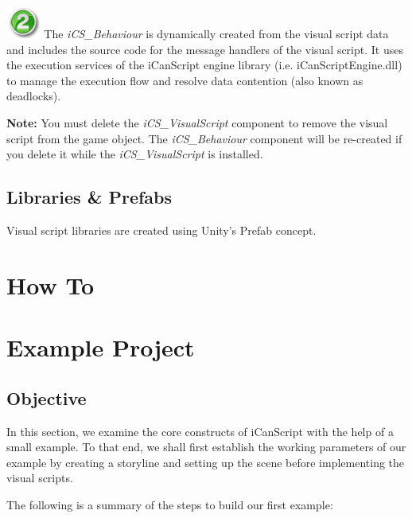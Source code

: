 \includegraphics[width=32pt,height=30pt]{stamp-2-green.png} The \emph{iCS\_Behaviour} is dynamically created from the visual script data and includes the source code for the message handlers of the visual script. It uses the execution services of the iCanScript engine library (i.e. iCanScriptEngine.dll) to manage the execution flow and resolve data contention (also known as deadlocks).
\begin{tipbox}

\textbf{Note:} You must delete the \emph{iCS\_VisualScript} component to remove the visual script from the game object. The \emph{iCS\_Behaviour} component will be re-created if you delete it while the \emph{iCS\_VisualScript} is installed.

\end{tipbox}



\chapter{Libraries \& Prefabs}
\label{librariesprefabs}

Visual script libraries are created using Unity’s Prefab concept. 

\pagebreak 

\part{How To}
\label{howto}

\part{Example Project}
\label{exampleproject}

\chapter{Objective}
\label{objective}

In this section, we examine the core constructs of iCanScript with the help of a small example. To that end, we shall first establish the working parameters of our example by creating a storyline and setting up the scene before implementing the visual scripts.

The following is a summary of the steps to build our first example:

